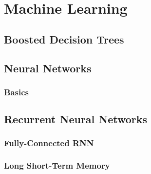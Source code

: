 \chapter{Machine Learning}
\label{sec:ml}

\section{Boosted Decision Trees}
\label{sec:bdt}

\section{Neural Networks}
\label{sec:nn}

\subsection{Basics}
\label{sec:nn_basics}

\section{Recurrent Neural Networks}
\label{sec:rnn}

\subsection{Fully-Connected RNN}
\label{sec:fully_connected_rnn}

\subsection{Long Short-Term Memory}
\label{sec:lstm}

